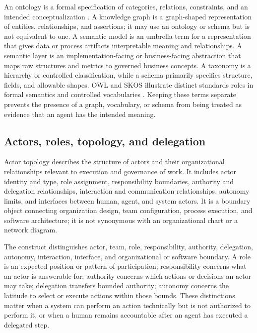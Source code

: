 \documentclass[11pt,letterpaper]{article}
\newcommand{\parencite}[1]{\citep{#1}}
\begin{document}
An ontology is a formal specification of categories, relations, constraints, and an intended conceptualization \parencite{gruber1993translation,guarino1998formal}. A knowledge graph is a graph-shaped representation of entities, relationships, and assertions; it may use an ontology or schema but is not equivalent to one. A semantic model is an umbrella term for a representation that gives data or process artifacts interpretable meaning and relationships. A semantic layer is an implementation-facing or business-facing abstraction that maps raw structures and metrics to governed business concepts. A taxonomy is a hierarchy or controlled classification, while a schema primarily specifies structure, fields, and allowable shapes. OWL and SKOS illustrate distinct standards roles in formal semantics and controlled vocabularies \parencite{w3cowl2004,w3cskos2009}. Keeping these terms separate prevents the presence of a graph, vocabulary, or schema from being treated as evidence that an agent has the intended meaning.

\subsection{Actors, roles, topology, and delegation}
Actor topology describes the structure of actors and their organizational relationships relevant to execution and governance of work. It includes actor identity and type, role assignment, responsibility boundaries, authority and delegation relationships, interaction and communication relationships, autonomy limits, and interfaces between human, agent, and system actors. It is a boundary object connecting organization design, team configuration, process execution, and software architecture; it is not synonymous with an organizational chart or a network diagram.

The construct distinguishes actor, team, role, responsibility, authority, delegation, autonomy, interaction, interface, and organizational or software boundary. A role is an expected position or pattern of participation; responsibility concerns what an actor is answerable for; authority concerns which actions or decisions an actor may take; delegation transfers bounded authority; autonomy concerns the latitude to select or execute actions within those bounds. These distinctions matter when a system can perform an action technically but is not authorized to perform it, or when a human remains accountable after an agent has executed a delegated step.
\end{document}

